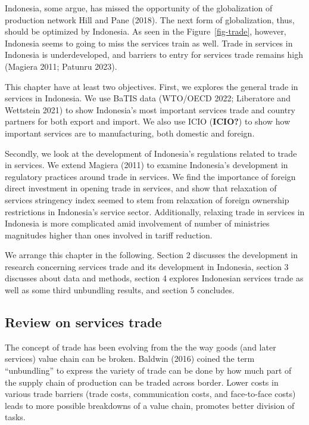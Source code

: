 \documentclass[
  letterpaper,
  DIV=11,
  numbers=noendperiod]{scrartcl}
\begin{document}
Indonesia, some argue, has missed the opportunity of the globalization
of production network Hill and Pane (2018). The next form of
globalization, thus, should be optimized by Indonesia. As seen in the
Figure~\ref{fig-trade}, however, Indonesia seems to going to miss the
services train as well. Trade in services in Indonesia is
underdeveloped, and barriers to entry for services trade remains high
(Magiera 2011; Patunru 2023).

This chapter have at least two objectives. First, we explores the
general trade in services in Indonesia. We use BaTIS data (WTO/OECD
2022; Liberatore and Wettstein 2021) to show Indonesia's most important
services trade and country partners for both export and import. We also
use ICIO (\textbf{ICIO?}) to show how important services are to
manufacturing, both domestic and foreign.

Secondly, we look at the development of Indonesia's regulations related
to trade in services. We extend Magiera (2011) to examine Indonesia's
development in regulatory practices around trade in services. We find
the importance of foreign direct investment in opening trade in
services, and show that relaxation of services stringency index seemed
to stem from relaxation of foreign ownership restrictions in Indonesia's
service sector. Additionally, relaxing trade in services in Indonesia is
more complicated amid involvement of number of ministries magnitudes
higher than ones involved in tariff reduction.

We arrange this chapter in the following. Section 2 discusses the
development in research concerning services trade and its development in
Indonesia, section 3 discusses about data and methods, section 4
explores Indonesian services trade as well as some third unbundling
results, and section 5 concludes.

\subsection{Review on services trade}\label{review-on-services-trade}

The concept of trade has been evolving from the the way goods (and later
services) value chain can be broken. Baldwin (2016) coined the term
``unbundling'' to express the variety of trade can be done by how much
part of the supply chain of production can be traded across border.
Lower costs in various trade barriers (trade costs, communication costs,
and face-to-face costs) leads to more possible breakdowns of a value
chain, promotes better division of tasks.
\end{document}
